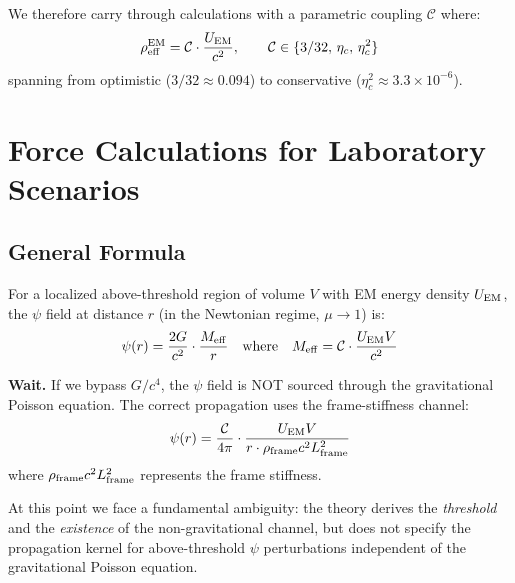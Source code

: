 \documentclass[12pt,a4paper]{article}
\begin{document}
We therefore carry through calculations with a parametric coupling
$\mathcal{C}$ where:
\begin{equation}
\rho_{\rm eff}^{\rm EM} = \mathcal{C} \cdot \frac{U_{\rm EM}}{c^2},
\qquad \mathcal{C} \in \{3/32, \, \eta_c, \, \eta_c^2\}
\end{equation}
spanning from optimistic ($3/32 \approx 0.094$) to conservative ($\eta_c^2 \approx 3.3 \times 10^{-6}$).

\section{Force Calculations for Laboratory Scenarios}
\label{sec:forces}

\subsection{General Formula}

For a localized above-threshold region of volume $V$ with EM energy density
$U_{\rm EM}$, the $\psi$ field at distance $r$ (in the Newtonian regime,
$\mu \to 1$) is:
\begin{equation}
\psi(r) = \frac{2G}{c^2} \cdot \frac{M_{\rm eff}}{r}
\quad \text{where} \quad M_{\rm eff} = \mathcal{C} \cdot \frac{U_{\rm EM} V}{c^2}
\end{equation}

\textbf{Wait.}  If we bypass $G/c^4$, the $\psi$ field is NOT sourced through
the gravitational Poisson equation.  The correct propagation uses the
frame-stiffness channel:
\begin{equation}
\psi(r) = \frac{\mathcal{C}}{4\pi} \cdot \frac{U_{\rm EM} V}{r \cdot \rho_{\rm frame} c^2 L_{\rm frame}^2}
\label{eq:psi-frame}
\end{equation}
where $\rho_{\rm frame} c^2 L_{\rm frame}^2$ represents the frame stiffness.

At this point we face a fundamental ambiguity: the theory derives the
\emph{threshold} and the \emph{existence} of the non-gravitational channel,
but does not specify the propagation kernel for above-threshold $\psi$ perturbations
independent of the gravitational Poisson equation.
\end{document}
